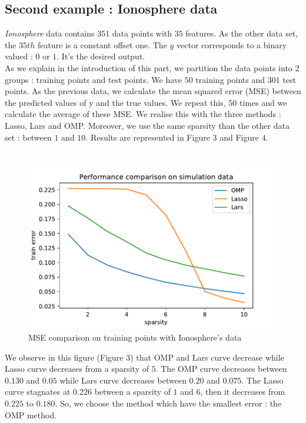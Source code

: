 \documentclass{article}
\begin{document}
\subsection{Second example : Ionosphere data}
\textit{Ionosphere} data contains $351$ data points with $35$ features. As the other data set, the $35th$ feature is a constant offset one. The $y$ vector corresponds to a binary valued : $0$ or $1$. It's the desired output.\\
As we explain in the introduction of this part, we partition the data points into $2$ groups : training points and test points. We have $50$ training points and $301$ test points. As the previous data, we calculate the mean squared error (MSE) between the predicted values of y and the true values. We repeat this, $50$ times and we calculate the average of these MSE. We realise this with the three methods : Lasso, Lars and OMP. Moreover, we use the same sparsity than the other data set : between $1$ and $10$. Results are represented in Figure $3$ and Figure $4$.\\
\\
\begin{figure}[!ht]
    \centering
    \includegraphics[scale=0.5]{./images/training_error_ionosphere.pdf}
    \caption{MSE comparison on training points with Ionosphere's data}
    \label{Figure 3}
\end{figure}
We observe in this figure (Figure $3$) that OMP and Lars curve decrease while Lasso curve decreases from a sparsity of $5$. The OMP curve decreases between $0.130$ and $0.05$ while Lars curve decreases between $0.20$ and $0.075$. The Lasso curve stagnates at $0.226$ between a sparsity of $1$ and $6$, then it decreases from $0.225$ to $0.180$. So, we choose the method which have the smallest error : the OMP method.\\
\end{document}
